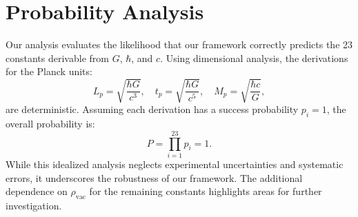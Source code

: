 \documentclass[12pt]{article}
\begin{document}
\section{Probability Analysis}
Our analysis evaluates the likelihood that our framework correctly predicts the 23 constants derivable from \(G\), \(\hbar\), and \(c\). Using dimensional analysis, the derivations for the Planck units:
\[
L_p = \sqrt{\frac{\hbar G}{c^3}},\quad t_p = \sqrt{\frac{\hbar G}{c^5}},\quad M_p = \sqrt{\frac{\hbar c}{G}},
\]
are deterministic. Assuming each derivation has a success probability \(p_i = 1\), the overall probability is:
\[
P = \prod_{i=1}^{23} p_i = 1.
\]
While this idealized analysis neglects experimental uncertainties and systematic errors, it underscores the robustness of our framework. The additional dependence on \(\rho_{\text{vac}}\) for the remaining constants highlights areas for further investigation.
\end{document}
